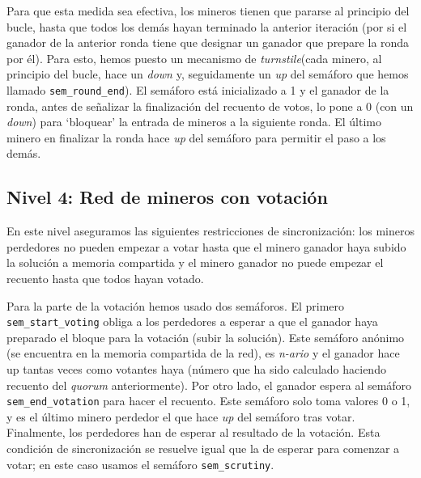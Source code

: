 \documentclass{article}
\begin{document}

Para que esta medida sea efectiva, los mineros tienen que pararse al principio del bucle, hasta que todos los demás hayan terminado la anterior iteración (por si el ganador de la anterior ronda tiene que designar un ganador que prepare la ronda por él). Para esto, hemos puesto un mecanismo de \textit{turnstile}\footnotemark \space (cada minero, al principio del bucle, hace un \textit{down} y, seguidamente un \textit{up} del semáforo que hemos llamado \texttt{sem\_round\_end}). El semáforo está inicializado a 1 y el ganador de la ronda, antes de señalizar la finalización del recuento de votos, lo pone a 0 (con un \textit{down}) para `bloquear' la entrada
de mineros a la siguiente ronda. El último minero en finalizar la ronda hace \textit{up} del semáforo para permitir el paso a los demás.


\subsection*{Nivel 4: Red de mineros con votación}

En este nivel aseguramos  las siguientes restricciones de sincronización: los mineros perdedores no pueden empezar a votar hasta que el minero ganador haya subido la solución a memoria compartida y el minero ganador no puede empezar el recuento hasta que todos hayan votado.

Para la parte de la votación hemos usado dos semáforos. El primero \texttt{sem\_start\_voting} obliga a los perdedores a esperar a que el ganador haya preparado el bloque para la votación (subir la solución). Este semáforo anónimo (se encuentra en la memoria compartida de la red), es \textit{n-ario} y el ganador hace up tantas veces como votantes haya (número que ha sido calculado haciendo  recuento del \textit{quorum} anteriormente). Por otro lado, el ganador espera al semáforo \texttt{sem\_end\_votation} para hacer el recuento. Este semáforo solo toma valores 0 o 1, y es el último minero perdedor el que hace \emph{up} del semáforo tras votar. Finalmente, los perdedores han de esperar al resultado de la votación. Esta condición de sincronización se resuelve igual que la de esperar para comenzar a votar; en este caso usamos el semáforo \texttt{sem\_scrutiny}.
\end{document}
